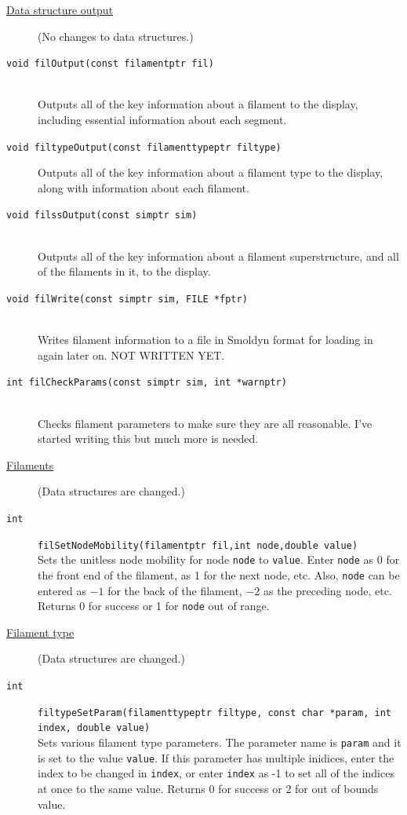 \documentclass {scrbook}
\newcommand {\ttt} {\texttt}
\begin{document}
\begin{description}
\item[\underline{Data structure output}]
(No changes to data structures.)

\item[\ttt{void filOutput(const filamentptr fil)}]
\hfill \\
Outputs all of the key information about a filament to the display, including essential information about each segment.

\item[\ttt{void filtypeOutput(const filamenttypeptr filtype)}]
Outputs all of the key information about a filament type to the display, along with information about each filament.

\item[\ttt{void filssOutput(const simptr sim)}]
\hfill \\
Outputs all of the key information about a filament superstructure, and all of the filaments in it, to the display.

\item[\ttt{void filWrite(const simptr sim, FILE *fptr)}]
\hfill \\
Writes filament information to a file in Smoldyn format for loading in again later on. NOT WRITTEN YET.

\item[\ttt{int filCheckParams(const simptr sim, int *warnptr)}]
\hfill \\
Checks filament parameters to make sure they are all reasonable. I've started writing this but much more is needed.

\item[\underline{Filaments}]
(Data structures are changed.)

\item[\ttt{int}]
\ttt{filSetNodeMobility(filamentptr fil,int node,double value)}
\hfill \\
Sets the unitless node mobility for node \ttt{node} to \ttt{value}. Enter \ttt{node} as 0 for the front end of the filament, as 1 for the next node, etc. Also, \ttt{node} can be entered as $-1$ for the back of the filament, $-2$ as the preceding node, etc. Returns 0 for success or 1 for \ttt{node} out of range.


\item[\underline{Filament type}]
(Data structures are changed.)

\item[\ttt{int}]
\ttt{filtypeSetParam(filamenttypeptr filtype, const char *param, int index, double value)}
\hfill \\
Sets various filament type parameters. The parameter name is \ttt{param} and it is set to the value \ttt{value}. If this parameter has multiple inidices, enter the index to be changed in \ttt{index}, or enter \ttt{index} as -1 to set all of the indices at once to the same value. Returns 0 for success or 2 for out of bounds value.


\end{description}
\end{document}
